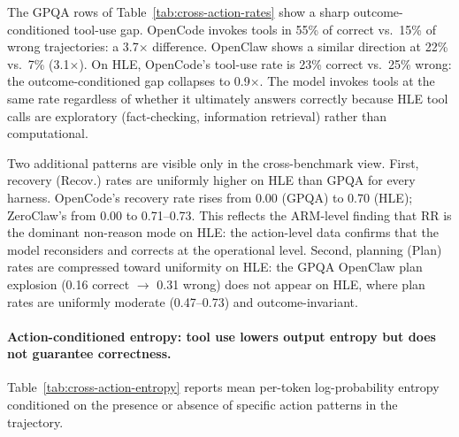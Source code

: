 The GPQA rows of Table~\ref{tab:cross-action-rates} show a sharp
outcome-conditioned tool-use gap.
OpenCode invokes tools in 55\% of correct vs.\ 15\% of wrong trajectories:
a 3.7$\times$ difference.
OpenClaw shows a similar direction at 22\% vs.\ 7\% (3.1$\times$).
On HLE, OpenCode's tool-use rate is 23\% correct vs.\ 25\% wrong: the
outcome-conditioned gap collapses to 0.9$\times$.
The model invokes tools at the same rate regardless of whether it
ultimately answers correctly because HLE tool calls are exploratory
(fact-checking, information retrieval) rather than computational.

Two additional patterns are visible only in the cross-benchmark view.
First, recovery (Recov.) rates are uniformly higher on HLE than GPQA for
every harness.
OpenCode's recovery rate rises from 0.00 (GPQA) to 0.70 (HLE); ZeroClaw's
from 0.00 to 0.71--0.73.
This reflects the ARM-level finding that RR is the dominant non-reason mode
on HLE: the action-level data confirms that the model reconsiders and
corrects at the operational level.
Second, planning (Plan) rates are compressed toward uniformity on HLE:
the GPQA OpenClaw plan explosion (0.16 correct $\to$ 0.31 wrong) does not
appear on HLE, where plan rates are uniformly moderate (0.47--0.73) and
outcome-invariant.

\paragraph{Action-conditioned entropy: tool use lowers output entropy but
does not guarantee correctness.}

Table~\ref{tab:cross-action-entropy} reports mean per-token log-probability
entropy conditioned on the presence or absence of specific action patterns
in the trajectory.

